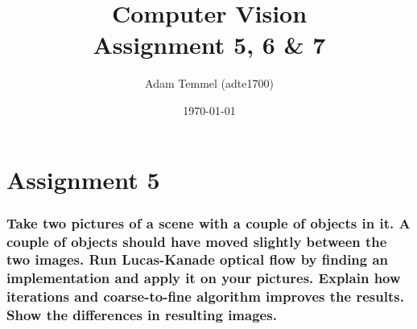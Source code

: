 \documentclass[a4paper, titlepage,12pt]{article}
\title{Computer Vision\\Assignment 5, 6 \& 7}
\author{Adam Temmel (adte1700)}
\date{\today}
\begin{document}
\maketitle

\section*{Assignment 5}
	\subsubsection*{Take two pictures of a scene with a couple of objects in it. A couple of objects should have moved slightly between the two images. Run Lucas-Kanade optical flow by finding an implementation and apply it on your pictures. Explain how iterations and coarse-to-fine algorithm improves the results. Show the differences in resulting images.}
\end{document}
